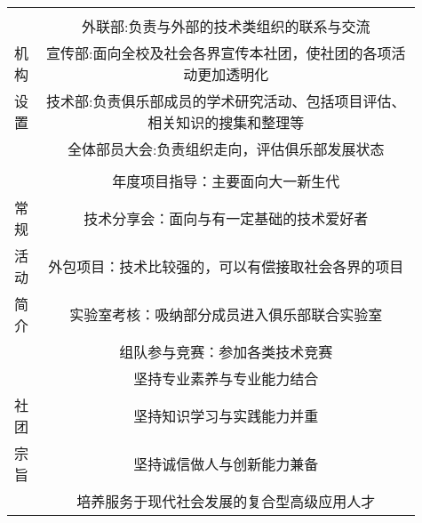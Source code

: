 \documentclass{BaseSetting}
\begin{document}
\begin{table}[H]
\begin{tabular}{|p{0.05\linewidth}|p{0.3\linewidth}|p{0.28\linewidth}|p{0.28\linewidth}|}
		     & \multicolumn{3}{c|}{}                                                                                                            \\
		     & \multicolumn{3}{c|}{外联部:负责与外部的技术类组织的联系与交流}                                                                   \\
		机构 & \multicolumn{3}{c|}{宣传部:面向全校及社会各界宣传本社团，使社团的各项活动更加透明化}                                             \\
		设置 & \multicolumn{3}{c|}{技术部:负责俱乐部成员的学术研究活动、包括项目评估、相关知识的搜集和整理等}                                   \\
		     & \multicolumn{3}{c|}{全体部员大会:负责组织走向，评估俱乐部发展状态}                                                               \\
		     & \multicolumn{3}{c|}{}                                                                                                            \\\hline

		     & \multicolumn{3}{c|}{年度项目指导：主要面向大一新生代}                                                                            \\
		常规 & \multicolumn{3}{c|}{技术分享会：面向与有一定基础的技术爱好者}                                                                    \\
		活动 & \multicolumn{3}{c|}{外包项目：技术比较强的，可以有偿接取社会各界的项目}                                                          \\
		简介 & \multicolumn{3}{c|}{实验室考核：吸纳部分成员进入俱乐部联合实验室}                                                                \\
		     & \multicolumn{3}{c|}{组队参与竞赛：参加各类技术竞赛}                                                                              \\ \hline

		     & \multicolumn{3}{c|}{坚持专业素养与专业能力结合}                                                                                  \\
		社团 & \multicolumn{3}{c|}{坚持知识学习与实践能力并重}                                                                                  \\
		宗旨 & \multicolumn{3}{c|}{坚持诚信做人与创新能力兼备}                                                                                  \\
		     & \multicolumn{3}{c|}{培养服务于现代社会发展的复合型高级应用人才}                                                                  \\ \hline


\end{tabular}
\end{table}
\end{document}
